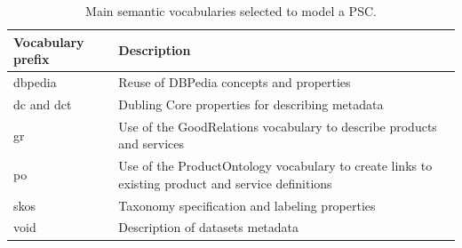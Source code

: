 \begin{itemize}
 \begin{table}[!ht]
\renewcommand{\arraystretch}{1.3}
\begin{center}
\begin{tabular}[c]{|l|p{8cm}|} 
\hline
  \textbf{Vocabulary prefix} &  \textbf{Description} \\\hline
 dbpedia &  Reuse of DBPedia concepts and properties \\ \hline 
 dc and dct & Dubling Core properties for describing metadata \\ \hline  
 gr & Use of the GoodRelations vocabulary to describe products and services \\\hline 
 po & Use of the ProductOntology vocabulary to create links to existing product and service definitions\\\hline 
 skos & Taxonomy specification and labeling properties \\ \hline
 void & Description of datasets metadata \\\hline
\hline
\end{tabular}
\caption{Main semantic vocabularies selected to model a PSC.}\label{table:vocabs} 
  \end{center}
\end{table} 





\end{itemize}
